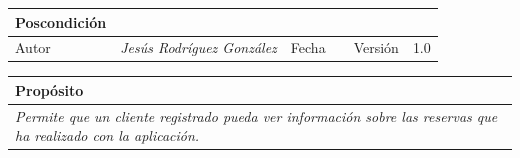 \begin{table}[H]
\begin{tabular}{llllllll}
        \multicolumn{1}{|l|}{Poscondición}                           & \multicolumn{7}{p{10cm}|}{{\color[HTML]{808080} \textit{}}}                                                                                                                                                                                                                                                       \\ \hline
        \multicolumn{1}{|l|}{Autor}                                  & \multicolumn{1}{l|}{{\color[HTML]{808080} \textit{Jesús Rodríguez González}}}                           & \multicolumn{2}{l|}{Fecha}                                                   & \multicolumn{1}{l|}{}                          & \multicolumn{2}{l|}{Versión}                                                      & \multicolumn{1}{l|}{1.0}                                                     \\ \hline
        \end{tabular}
    \end{table}

    \begin{table}[H]
        \begin{tabular}{llllllll}
        \hline
        \multicolumn{8}{|l|}{\cellcolor[HTML]{F2F2F2}Propósito}                                                                                                                                                                                                                                                                                                                                                                                           \\ \hline
        \multicolumn{8}{|p{15cm}|}{{\color[HTML]{808080} \textit{Permite que un cliente registrado pueda ver información sobre las reservas que ha realizado con la aplicación.}}}                                                                                                                                                                                                             \\ \hline
        \end{tabular}
    \end{table}

